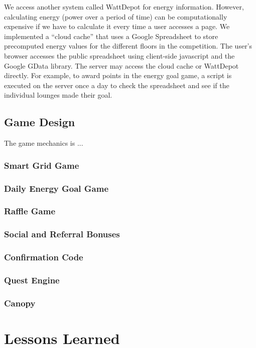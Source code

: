 \documentclass{acm_proc_article-sp}
\begin{document}
We access another system called WattDepot for energy information. However, calculating energy (power over a period of time) can be computationally expensive if we have to calculate it every time a user accesses a page. We implemented a ``cloud cache'' that uses a Google Spreadsheet to store precomputed energy values for the different floors in the competition. The user's browser accesses the public spreadsheet using client-side javascript and the Google GData library. The server may access the cloud cache or WattDepot directly. For example, to award points in the energy goal game, a script is executed on the server once a day to check the spreadsheet and see if the individual lounges made their goal.

\subsection{Game Design}
The game mechanics is ...

\subsubsection{Smart Grid Game}
\subsubsection{Daily Energy Goal Game}
\subsubsection{Raffle Game}
\subsubsection{Social and Referral Bonuses}
\subsubsection{Confirmation Code}
\subsubsection{Quest Engine}
\subsubsection{Canopy}



\section{Lessons Learned}
\end{document}
